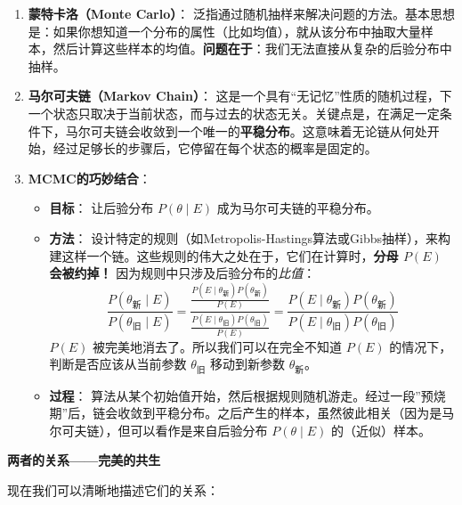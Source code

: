 \documentclass[
]{book}
\providecommand{\tightlist}{%
  \setlength{\itemsep}{0pt}\setlength{\parskip}{0pt}}
\begin{document}
\begin{enumerate}
\def\labelenumi{\arabic{enumi}.}
\item
  \textbf{蒙特卡洛（Monte Carlo）}： 泛指通过随机抽样来解决问题的方法。基本思想是：如果你想知道一个分布的属性（比如均值），就从该分布中抽取大量样本，然后计算这些样本的均值。\textbf{问题在于}：我们无法直接从复杂的后验分布中抽样。
\item
  \textbf{马尔可夫链（Markov Chain）}： 这是一个具有``无记忆''性质的随机过程，下一个状态只取决于当前状态，而与过去的状态无关。关键点是，在满足一定条件下，马尔可夫链会收敛到一个唯一的\textbf{平稳分布}。这意味着无论链从何处开始，经过足够长的步骤后，它停留在每个状态的概率是固定的。
\item
  \textbf{MCMC的巧妙结合}：

  \begin{itemize}
  \tightlist
  \item
    \textbf{目标}： 让后验分布 \(P(\theta \mid E)\) 成为马尔可夫链的平稳分布。
  \item
    \textbf{方法}： 设计特定的规则（如Metropolis-Hastings算法或Gibbs抽样），来构建这样一个链。这些规则的伟大之处在于，它们在计算时，\textbf{分母 \(P(E)\) 会被约掉！} 因为规则中只涉及后验分布的\emph{比值}：
    \[ \frac{P(\theta_{\text{新}} \mid E)}{P(\theta_{\text{旧}} \mid E)} = \frac{\frac{P(E \mid \theta_{\text{新}})P(\theta_{\text{新}})}{P(E)}}{\frac{P(E \mid \theta_{\text{旧}})P(\theta_{\text{旧}})}{P(E)}} = \frac{P(E \mid \theta_{\text{新}})P(\theta_{\text{新}})}{P(E \mid \theta_{\text{旧}})P(\theta_{\text{旧}})} \]
    \(P(E)\) 被完美地消去了。所以我们可以在完全不知道 \(P(E)\) 的情况下，判断是否应该从当前参数 \(\theta_{\text{旧}}\) 移动到新参数 \(\theta_{\text{新}}\)。
  \item
    \textbf{过程}： 算法从某个初始值开始，然后根据规则随机游走。经过一段''预烧期''后，链会收敛到平稳分布。之后产生的样本，虽然彼此相关（因为是马尔可夫链），但可以看作是来自后验分布 \(P(\theta \mid E)\) 的（近似）样本。
  \end{itemize}
\end{enumerate}

\textbf{两者的关系------完美的共生}

现在我们可以清晰地描述它们的关系：
\end{document}
